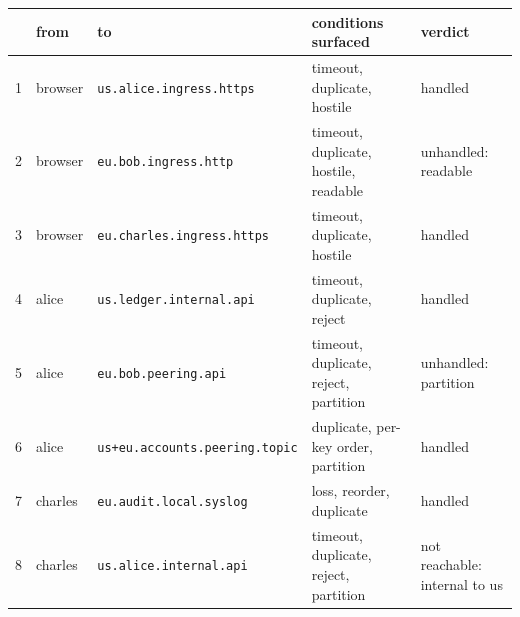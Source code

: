 \begin{tabular}{@{}rlp{}p{}p{}@{}}
\toprule
& from & to & conditions surfaced & verdict \\
\midrule
1 & browser & \texttt{us.alice.ingress.https} & timeout, duplicate, hostile & handled \\
2 & browser & \texttt{eu.bob.ingress.http} & timeout, duplicate, hostile, readable & \textcolor{red!75!diagramink}{unhandled: readable} \\
3 & browser & \texttt{eu.charles.ingress.https} & timeout, duplicate, hostile & handled \\
4 & alice & \texttt{us.ledger.internal.api} & timeout, duplicate, reject & handled \\
5 & alice & \texttt{eu.bob.peering.api} & timeout, duplicate, reject, partition & \textcolor{red!75!diagramink}{unhandled: partition} \\
6 & alice & \texttt{us+eu.accounts.peering.topic} & duplicate, per-key order, partition & handled \\
7 & charles & \texttt{eu.audit.local.syslog} & loss, reorder, duplicate & handled \\
8 & charles & \texttt{us.alice.internal.api} & timeout, duplicate, reject, partition & \textcolor{red!75!diagramink}{not reachable: internal to us} \\
\bottomrule
\end{tabular}
